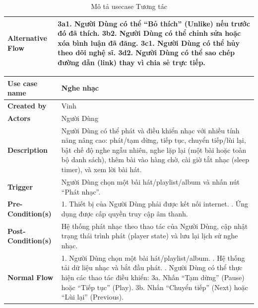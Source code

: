 \documentclass[a4paper]{article}
\newcommand{\cach}{\hspace*{1.5em}\ignorespaces}
\begin{document}
\begin{table}[h!]
\begin{tabularx}{\textwidth}{|l|X|}
\textbf{Alternative Flow} 
& 3a1. Người Dùng có thể “Bỏ thích” (Unlike) nếu trước đó đã thích. \newline
  3b2. Người Dùng có thể chỉnh sửa hoặc xóa bình luận đã đăng. \newline
  3c1. Người Dùng có thể hủy theo dõi nghệ sĩ. \newline
  3d2. Người Dùng có thể sao chép đường dẫn (link) thay vì chia sẻ trực tiếp. \\ \hline
\end{tabularx}
\caption{Mô tả usecase Tương tác}
\end{table}

\begin{table}[h!]
\centering
\renewcommand{\arraystretch}{1.3} %
\begin{tabularx}{\textwidth}{|l|X|}
\hline
\textbf{Use case name} & Nghe nhạc \\ \hline
\textbf{Created by}    & Vinh \\ \hline
\textbf{Actors}        & Người Dùng \\ \hline
\textbf{Description}   & Người Dùng có thể phát và điều khiển nhạc với nhiều tính năng nâng cao: phát/tạm dừng, tiếp tục, chuyển tiếp/lùi lại, bật chế độ nghe ngẫu nhiên, nghe lặp lại (một bài hoặc toàn bộ danh sách), thêm bài vào hàng chờ, cài giờ tắt nhạc (sleep timer), và xem lời bài hát. \\ \hline
\textbf{Trigger}       & Người Dùng chọn một bài hát/playlist/album và nhấn nút “Phát nhạc”. \\ \hline
\textbf{Pre-Condition(s)} 
& 1. Thiết bị của Người Dùng phải được kết nối internet. \newline
  2. Ứng dụng được cấp quyền truy cập âm thanh. \\ \hline
\textbf{Post-Condition(s)} 
& Hệ thống phát nhạc theo thao tác của Người Dùng, cập nhật trạng thái trình phát (player state) và lưu lại lịch sử nghe nhạc. \\ \hline
\textbf{Normal Flow}   
& 1. Người Dùng chọn một bài hát/playlist/album. \newline
  2. Hệ thống tải dữ liệu nhạc và bắt đầu phát. \newline
  3. Người Dùng có thể thực hiện các thao tác điều khiển: \newline
  \cach 3a. Nhấn “Tạm dừng” (Pause) hoặc “Tiếp tục” (Play). \newline
  \cach 3b. Nhấn “Chuyển tiếp” (Next) hoặc “Lùi lại” (Previous). \newline

\end{tabularx}
\end{table}
\end{document}
